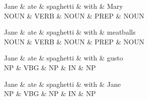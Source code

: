 \documentclass{article}
\begin{document}
    \begin{dependency}[theme=simple]
        \begin{deptext}
			Jane \& ate \& spaghetti \& with \& Mary \\
            NOUN \& VERB \& NOUN \& PREP \& NOUN \\
        \end{deptext}
    \end{dependency}

    \begin{dependency}[theme=simple]
        \begin{deptext}
			Jane \& ate \& spaghetti \& with \& meatballs \\
            NOUN \& VERB \& NOUN \& PREP \& NOUN \\
        \end{deptext}
    \end{dependency}

    \begin{dependency}
        \begin{deptext}
			Jane \& ate \& spaghetti \& with \& gusto \\
            NP \& VBG \& NP \& IN \& NP \\
        \end{deptext}
    \end{dependency}
    
    \begin{dependency}
        \begin{deptext}
			Jane \& ate \& spaghetti \& with \& Jane \\
            NP \& VBG \& NP \& IN \& NP \\
        \end{deptext}
    \end{dependency}
    
\end{document}
